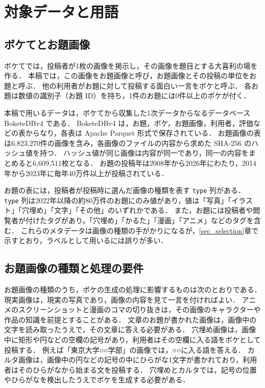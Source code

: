\section{対象データと用語}
\label{sec_data}
\subsection{ボケてとお題画像}
ボケてでは，投稿者が1枚の画像を掲示し，その画像を題目とする大喜利の場を作る．
本稿では，この画像をお題画像と呼び，お題画像とその投稿の単位をお題と呼ぶ．
他の利用者がお題に対して投稿する面白い一言をボケと呼ぶ．
各お題は数値の識別子（お題 ID）を持ち，1件のお題には0件以上のボケが付く．

本稿で用いるデータは，ボケてから収集した1次データからなるデータベース BoketeDBv4 である．
BoketeDBv4 は，お題，ボケ，お題画像，利用者，評価などの表からなり，各表は Apache Parquet 形式で保存されている．
お題画像の表は6,823,270件の画像を含み，各画像のファイルの内容から求めた SHA-256 のハッシュ値を持つ．
ハッシュ値が同じ画像は内容が同一であり，同一の内容をまとめると6,609,511枚となる．
お題の投稿年は2008年から2026年にわたり，2014年から2023年に毎年40万件以上が投稿されている．

お題の表には，投稿者が投稿時に選んだ画像の種類を表す \texttt{type} 列がある．
\texttt{type} 列は2022年以降の約80万件のお題にのみ値があり，値は「写真」「イラスト」「穴埋め」「文字」「その他」のいずれかである．
また，お題には投稿者や閲覧者が付けたタグがあり，「穴埋め」「かるた」「漫画」「アニメ」などのタグを含む．
これらのメタデータは画像の種類の手がかりになるが，\ref{sec_selection}章で示すとおり，ラベルとして用いるには誤りが多い．

\subsection{お題画像の種類と処理の要件}
お題画像の種類のうち，ボケの生成の処理に影響するものは次のとおりである．
現実画像は，現実の写真であり，画像の内容を見て一言を付ければよい．
アニメのスクリーンショットと漫画のコマの切り抜きは，その画像のキャラクターや作品の知識を前提とすることがある．
文章のお題が書かれた画像は，画像中の文字を読み取ったうえで，その文章に答える必要がある．
穴埋め画像は，画像中に矩形や円などの空欄の記号があり，利用者はその空欄に入る語をボケとして投稿する．
例えば「東京大学○○学部」の画像では，○○に入る語を答える．
カルタ画像は，画像中の円などの記号の中にひらがな1文字が書かれており，利用者はそのひらがなから始まる文を投稿する．
穴埋めとカルタでは，記号の位置やひらがなを検出したうえでボケを生成する必要がある．

